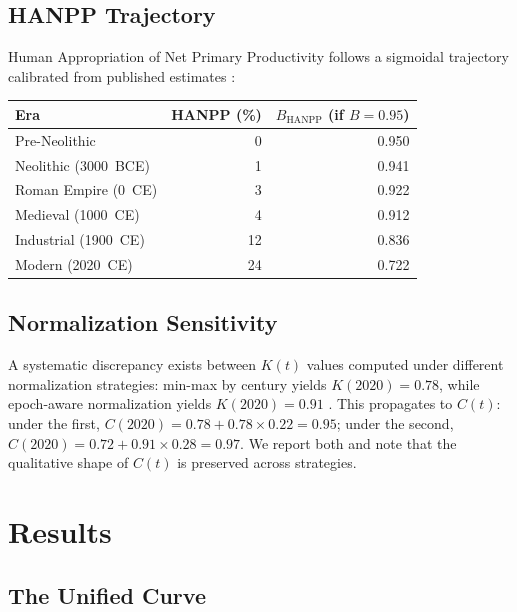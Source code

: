 \documentclass[10pt,letterpaper]{article}
\newcommand{\kt}{$K(t)$}
\newcommand{\ct}{$C(t)$}
\begin{document}
\subsection*{HANPP Trajectory}

Human Appropriation of Net Primary Productivity follows a sigmoidal
trajectory calibrated from published estimates
\cite{haberl2007, krausmann2013}:

\begin{center}
\begin{tabular}{lrr}
\toprule
Era & HANPP (\%) & $B_{\text{HANPP}}$ (if $B = 0.95$) \\
\midrule
Pre-Neolithic & 0 & 0.950 \\
Neolithic (3000~BCE) & 1 & 0.941 \\
Roman Empire (0~CE) & 3 & 0.922 \\
Medieval (1000~CE) & 4 & 0.912 \\
Industrial (1900~CE) & 12 & 0.836 \\
Modern (2020~CE) & 24 & 0.722 \\
\bottomrule
\end{tabular}
\end{center}

\subsection*{Normalization Sensitivity}

A systematic discrepancy exists between \kt{} values computed under
different normalization strategies: min-max by century yields
$K(2020) = 0.78$, while epoch-aware normalization yields $K(2020) = 0.91$
\cite{stoltz2026kt}. This propagates to \ct{}: under the first,
$C(2020) = 0.78 + 0.78 \times 0.22 = 0.95$; under the second,
$C(2020) = 0.72 + 0.91 \times 0.28 = 0.97$. We report both and note
that the qualitative shape of \ct{} is preserved across strategies.

\section*{Results}

\subsection*{The Unified Curve}
\end{document}
